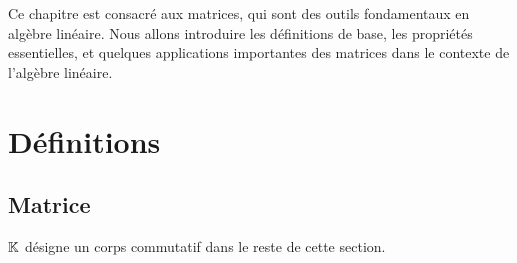 \documentclass[12pt, a4paper]{report}
\begin{document}

\tableofcontents
\clearpage

\vspace*{\fill}
Ce chapitre est consacré aux matrices, qui sont des outils fondamentaux en algèbre linéaire. Nous allons introduire les définitions de base, les propriétés essentielles, et quelques applications importantes des matrices dans le contexte de l'algèbre linéaire.
\vspace*{\fill}

\chapter{Définitions}

\section{Matrice}

\begin{importantbox}
    $\mathbb{K}$ désigne un corps commutatif dans le reste de cette section.
\end{importantbox}
\end{document}
